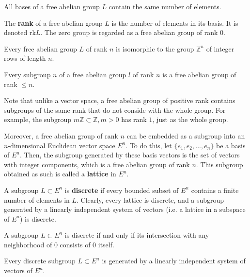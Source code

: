   \begin{theorem}
    All bases of a free abelian group $L$ contain the same number of elements. 
  \end{theorem}

  \begin{definition}
    The \textbf{rank} of a free abelian group $L$ is the number of elements in its basis. It is denoted rk$L$. The zero group is regarded as a free abelian group of rank $0$. 
  \end{definition}

  \begin{theorem}
    Every free abelian group $L$ of rank $n$ is isomorphic to the group $\mathbb{Z}^n$ of integer rows of length $n$. 
  \end{theorem}

  \begin{theorem}
    Every subgroup $n$ of a free abelian group $l$ of rank $n$ is a free abelian group of rank $ \leq n$. 
  \end{theorem}

  Note that unlike a vector space, a free abelian group of positive rank contains subgroups of the same rank that do not conside with the whole group. For example, the subgroup $m \mathbb{Z} \subset \mathbb{Z}, m > 0$ has rank $1$, just as the whole group. 

  Moreover, a free abelian group of rank $n$ can be embedded as a subgroup into an $n$-dimensional Euclidean vector space $E^n$. To do this, let $\{e_1, e_2, ..., e_n\}$ be a basis of $E^n$. Then, the subgroup generated by these basis vectors is the set of vectors with integer components, which is a free abelian group of rank $n$. This subgroup obtained as such is called a \textbf{lattice} in $E^n$. 

  \begin{definition}
    A subgroup $L \subset E^n$ is \textbf{discrete} if every bounded subset of $E^n$ contains a finite number of elements in $L$. Clearly, every lattice is discrete, and a subgroup generated by a linearly independent system of vectors (i.e. a lattice in a subspace of $E^n$) is discrete. 
  \end{definition}

  \begin{proposition}
    A subgroup $L \subset E^n$ is discrete if and only if its intersection with any neighborhood of $0$ consists of $0$ itself. 
  \end{proposition}

  \begin{theorem}
    Every discrete subgroup $L \subset E^n$ is generated by a linearly independent system of vectors of $E^n$. 
  \end{theorem}

